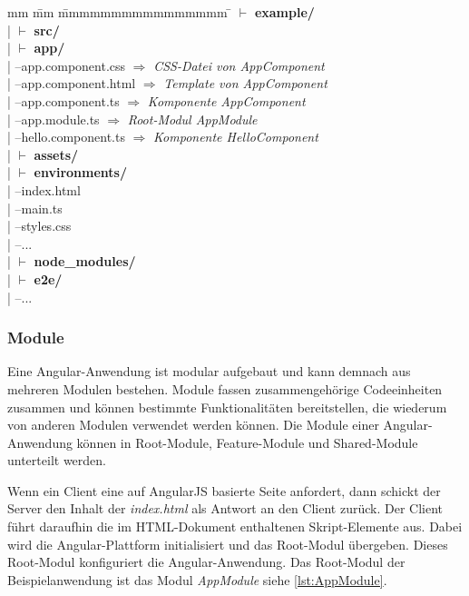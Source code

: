 \begin{tabbing}
	mm \= mm \= mmmmmmmmmmmmmmmm \= \kill
	$\vdash$ \textbf{example/} \\ 
	| \> $\vdash$ \textbf{src/}\\ 
	| \> \> $\vdash$  \textbf{app/}\\
	| \> \>  --app.component.css  $\Rightarrow$ \textit{CSS-Datei von AppComponent}\\ 
	| \> \>  --app.component.html  $\Rightarrow$ \textit{Template von AppComponent}\\
	| \> \>  --app.component.ts	 $\Rightarrow$ \textit{Komponente AppComponent}\\
	| \> \>  --app.module.ts  $\Rightarrow$ \textit{Root-Modul AppModule}\\
	| \> \>  --hello.component.ts  $\Rightarrow$ \textit{Komponente HelloComponent}\\
	| \> \> $\vdash$ \textbf{assets/} \\
	| \> \> $\vdash$ \textbf{environments/} \\
	| \> --index.html\\
	| \> --main.ts\\
	| \> --styles.css \\
	| \> --... \\
	| \> $\vdash$ \textbf{node\_modules/}\\ 
	| \> $\vdash$ \textbf{e2e/}\\   
	| --...\\
\end{tabbing}


\subsubsection{Module}

Eine Angular-Anwendung ist modular aufgebaut und kann demnach aus mehreren Modulen bestehen. Module fassen zusammengehörige Codeeinheiten zusammen und können bestimmte Funktionalitäten bereitstellen, die wiederum von anderen Modulen verwendet werden können. \autocites[vgl.][103\psqq]{Steyer.2017} Die Module einer Angular-Anwendung können in Root-Module, Feature-Module und Shared-Module unterteilt werden. 

Wenn ein Client eine auf AngularJS basierte Seite anfordert, dann schickt der Server den Inhalt der \textit{index.html} als Antwort an den Client zurück. Der Client führt daraufhin die im HTML-Dokument enthaltenen Skript-Elemente aus. Dabei wird die Angular-Plattform initialisiert und das Root-Modul übergeben. Dieses Root-Modul konfiguriert die Angular-Anwendung.\autocites[vgl.][60]{Steyer.2017}[vgl.][226\psqq]{Freeman.2018}  Das Root-Modul der Beispielanwendung ist das Modul \textit{AppModule} siehe \autoref{lst:AppModule}. 

